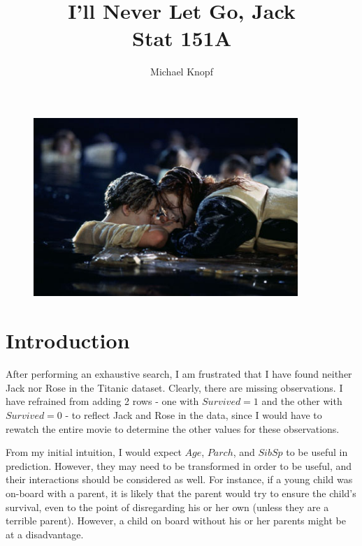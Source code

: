 \documentclass[12pt]{article}
\begin{document}
\title{I'll Never Let Go, Jack \\ Stat 151A}
\author{Michael Knopf}
 
\maketitle

\begin{figure}[ht!]
\centering
\includegraphics[width=100mm]{titanic_pic.jpg}
\end{figure}

\section{Introduction}

After performing an exhaustive search, I am frustrated that I have found neither Jack nor Rose in the Titanic dataset.  Clearly, there are missing observations.  I have refrained from adding 2 rows - one with $Survived = 1$ and the other with $Survived = 0$ - to reflect Jack and Rose in the data, since I would have to rewatch the entire movie to determine the other values for these observations.

From my initial intuition, I would expect $Age$, $Parch$, and $SibSp$ to be useful in prediction.  However, they may need to be transformed in order to be useful, and their interactions should be considered as well.  For instance, if a young child was on-board with a parent, it is likely that the parent would try to ensure the child's survival, even to the point of disregarding his or her own (unless they are a terrible parent).  However, a child on board without his or her parents might be at a disadvantage.

\pagebreak
\end{document}
